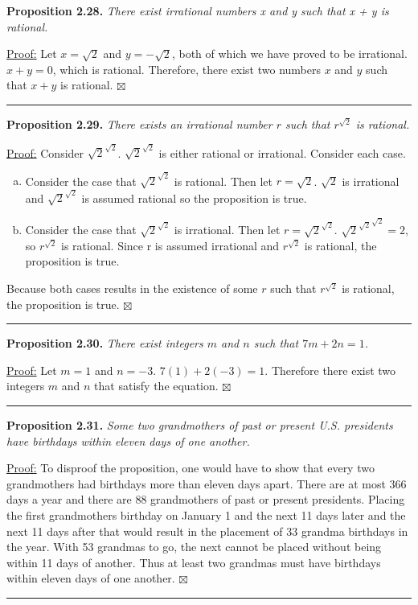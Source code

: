 \documentclass[a4paper,12pt]{article}
\newcommand{\entry}[3]
{
   \noindent\textbf{#1.}
   \emph{#2}
   \bigskip

   \noindent#3
   \bigskip
   \hrule
   \vspace{24pt}
}
\newcommand{\sig}{$\boxtimes$}
\begin{document}
\entry{Proposition 2.28}
{There exist irrational numbers x and y such that x + y is rational.}
{
\underline{Proof:} Let $x = \sqrt{2}$ and $y = -\sqrt{2}$, both of which we have proved to be irrational. $x + y = 0$, which is rational. Therefore, there exist two numbers $x$ and $y$ such that $x + y$ is rational. \sig
}



\entry{Proposition 2.29}
{There exists an irrational number $r$ such that $r^{\sqrt{2}}$ is rational.}
{
\underline{Proof:} Consider $\sqrt{2}^{\sqrt{2}}$. $\sqrt{2}^{\sqrt{2}}$ is either rational or irrational. Consider each case.
\begin{enumerate}[(a)]
\item
Consider the case that $\sqrt{2}^{\sqrt{2}}$ is rational. Then let $r = \sqrt{2}$. $\sqrt{2}$ is irrational and $\sqrt{2}^{\sqrt{2}}$ is assumed rational so the proposition is true.
\item
Consider the case that $\sqrt{2}^{\sqrt{2}}$ is irrational. Then let $r = \sqrt{2}^{\sqrt{2}}$. ${\sqrt{2}^{\sqrt{2}}}^{\sqrt{2}} = 2$, so $r^{\sqrt{2}}$ is rational. Since r is assumed irrational and $r^{\sqrt{2}}$ is rational, the proposition is true.
\end{enumerate}
Because both cases results in the existence of some $r$ such that $r^{\sqrt{2}}$ is rational, the proposition is true. \sig
}



\entry{Proposition 2.30}
{There exist integers $m$ and $n$ such that $7m + 2n = 1$.}
{\underline{Proof:} Let $m = 1$ and $n = -3$. $7(1) + 2(-3) = 1$. Therefore there exist two integers $m$ and $n$ that satisfy the equation. \sig}



\entry{Proposition 2.31}
{Some two grandmothers of past or present U.S. presidents have birthdays within eleven days of one another.}
{
\underline{Proof:} To disproof the proposition, one would have to show that every two grandmothers had birthdays more than eleven days apart. There are at most 366 days a year and there are 88 grandmothers of past or present presidents. Placing the first grandmothers birthday on January 1 and the next 11 days later and the next 11 days after that would result in the placement of 33 grandma birthdays in the year. With 53 grandmas to go, the next cannot be placed without being within 11 days of another. Thus at least two grandmas must have birthdays within eleven days of one another. \sig
}
\end{document}
